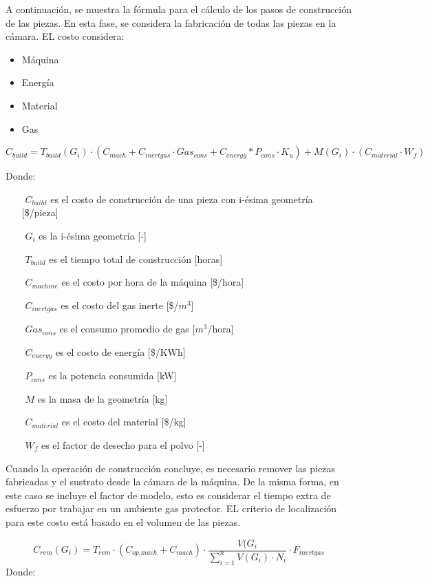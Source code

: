 \begin{description}
\begin{itemize}
\end{itemize}

A continuación, se muestra la fórmula para el cálculo de los pasos de construcción de las piezas. En esta fase, se considera la fabricación de todas las piezas en la cámara. EL costo considera:
\begin{itemize}
\item Máquina
\item Energía
\item Material
\item Gas
\end{itemize}


$$C_{build}=T_{build}(G_i)\cdot(C_{mach}+C_{inertgas}\cdot Gas_{cons}+C_{energy}*P_{cons}\cdot K_u)+M(G_i)\cdot (C_{material}\cdot W_f)$$


Donde:

\begin{itemize}
\item[$ $] $C_{build}$ es el costo de construcción de una pieza con i-ésima geometría [\$/pieza]
\item[$ $] $G_i$ es la i-ésima geometría [-]
\item[$ $] $T_{build}$ es el tiempo total de construcción [horas]
\item[$ $] $C_{machine}$ es el costo por hora de la máquina [\$/hora]
\item[$ $] $C_{inertgas}$ es el costo del gas inerte [\$/$m^3$]
\item[$ $] $Gas_{cons}$ es el consumo promedio de gas [$m^3$/hora]
\item[$ $] $C_{energy}$ es el costo de energía [\$/KWh]
\item[$ $] $P_{cons}$ es la potencia consumida [kW]
\item[$ $] $M$ es la masa de la geometría [kg]
\item[$ $] $C_{material}$ es el costo del material [\$/kg]
\item[$ $] $W_f$ es el factor de desecho para el polvo [-]
\end{itemize}

Cuando la operación de construcción concluye, es necesario remover las piezas fabricadas y el sustrato desde la cámara de la máquina. De la misma forma, en este caso se incluye el factor de modelo, esto es considerar el tiempo extra de esfuerzo por trabajar en un ambiente gas protector. EL criterio de localización para este costo está basado en el volumen de las piezas.

\begin{equation*}
C_{rem}(G_i)=T_{rem}\cdot (C_{op.mach}+C_{mach})\cdot\frac{V(G_i}{\sum_{i=1}^{n} V(G_i)\cdot N_i}\cdot F_{inertgas} 
\end{equation*}
Donde:


\end{description}
